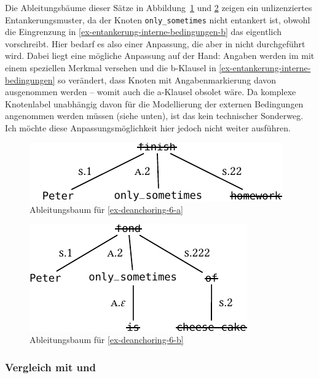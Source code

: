 Die Ableitungsbäume dieser Sätze in Abbildung~\ref{fig-deanchoring-6} und \ref{fig-deanchoring-7} zeigen ein unlizenziertes Ent\-ankerungsmuster, da der Knoten {\tt only\_sometimes} nicht entankert ist, obwohl die Eingrenzung in \ref{ex-entankerung-interne-bedingungen-b} das eigentlich vorschreibt. Hier bedarf es also einer Anpassung, die aber in \cite{Lichte:Kallmeyer:10} nicht durchgeführt wird. Dabei liegt eine mögliche Anpassung auf der Hand: Angaben werden im  mit einem speziellen Merkmal versehen und die b-Klausel in \ref{ex-entankerung-interne-bedingungen} so verändert, dass Knoten mit Angabenmarkierung davon ausgenommen werden -- womit auch die a-Klausel obsolet wäre. Da komplexe Knotenlabel unabhängig davon für die Modellierung der externen Bedingungen  angenommen werden müssen (siehe unten), ist das kein technischer Sonderweg. Ich möchte diese Anpassungsmöglichkeit hier jedoch nicht weiter ausführen.

\begin{figure}[t]
\centering
\includegraphics{graphics/abb819.pdf}
\caption{\label{fig-deanchoring-6}Ableitungsbaum für \ref{ex-deanchoring-6-a} \citep[Figure~8]{Lichte:Kallmeyer:10}}
\end{figure}

\begin{figure}[t]
\centering
\includegraphics{graphics/abb820.pdf}
\caption{\label{fig-deanchoring-7}Ableitungsbaum für \ref{ex-deanchoring-6-b} \citep[Figure~9]{Lichte:Kallmeyer:10}}
\end{figure}

\subsubsection*{Vergleich mit \cite{Osborne:08} und \cite{Kobele:09}}

